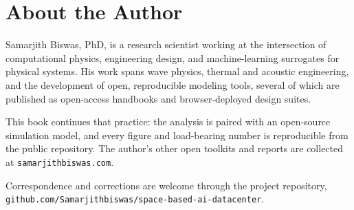 \clearpage
\chapter*{About the Author}

\noindent Samarjith Biswas, PhD, is a research scientist working at the intersection of computational
physics, engineering design, and machine-learning surrogates for physical systems. His work spans
wave physics, thermal and acoustic engineering, and the development of open, reproducible modeling
tools, several of which are published as open-access handbooks and browser-deployed design suites.

\vspace{8pt}
\noindent This book continues that practice: the analysis is paired with an open-source simulation
model, and every figure and load-bearing number is reproducible from the public repository. The
author's other open toolkits and reports are collected at \texttt{samarjithbiswas.com}.

\vspace{8pt}
\noindent Correspondence and corrections are welcome through the project repository,
\texttt{github.com/Samarjithbiswas/space-based-ai-datacenter}.
